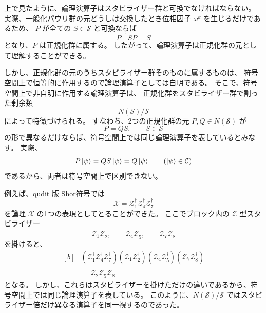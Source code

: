 \documentclass[../master.tex]{subfiles}
\begin{document}
上で見たように、論理演算子はスタビライザー群と可換でなければならない。
実際、一般化パウリ群の元どうしは交換したとき位相因子 $\omega^k$ を生じるだけであるため、
$P$ が全ての $S\in\mathcal{S}$ と可換ならば
\begin{equation}
    P^{-1}SP=S
\end{equation}
となり、$P$ は正規化群に属する。
したがって、論理演算子は正規化群の元として理解することができる。

しかし、正規化群の元のうちスタビライザー群そのものに属するものは、
符号空間上で恒等的に作用するので論理演算子としては自明である。
そこで、符号空間上で非自明に作用する論理演算子は、
正規化群をスタビライザー群で割った剰余類
\begin{equation}
    N(\mathcal{S})/\mathcal{S}
\end{equation}
によって特徴づけられる。
すなわち、2つの正規化群の元 $P,Q\in N(\mathcal{S})$ が
\begin{equation}
    P=QS,\qquad S\in\mathcal{S}
\end{equation}
の形で異なるだけならば、符号空間上では同じ論理演算子を表しているとみなす。
実際、
\begin{equation}
    P\ket{\psi}=QS\ket{\psi}=Q\ket{\psi}\qquad (\ket{\psi}\in\mathcal{C})
\end{equation}
であるから、両者は符号空間上で区別できない。

例えば、qudit 版 Shor符号では
\begin{equation}
    \overline{\mathcal{X}}
    =\mathcal{Z}_1^\dagger \mathcal{Z}_4^\dagger \mathcal{Z}_7^\dagger
\end{equation}
を論理 $\mathcal{X}$ の1つの表現としてとることができた。
ここでブロック内の $\mathcal{Z}$ 型スタビライザー
\begin{equation}
    \mathcal{Z}_1\mathcal{Z}_2^\dagger,\qquad
    \mathcal{Z}_4\mathcal{Z}_5^\dagger,\qquad
    \mathcal{Z}_7\mathcal{Z}_8^\dagger
\end{equation}
を掛けると、
\begin{equation}\begin{aligned}[b]
    &(\mathcal{Z}_1^\dagger \mathcal{Z}_4^\dagger \mathcal{Z}_7^\dagger)
    (\mathcal{Z}_1\mathcal{Z}_2^\dagger)
    (\mathcal{Z}_4\mathcal{Z}_5^\dagger)
    (\mathcal{Z}_7\mathcal{Z}_8^\dagger)\\
    &= \mathcal{Z}_2^\dagger \mathcal{Z}_5^\dagger \mathcal{Z}_8^\dagger
\end{aligned}\end{equation}
となる。
しかし、これらはスタビライザーを掛けただけの違いであるから、符号空間上では同じ論理演算子を表している。
このように、$N(\mathcal{S})/\mathcal{S}$ ではスタビライザー倍だけ異なる演算子を同一視するのであった。
\end{document}
